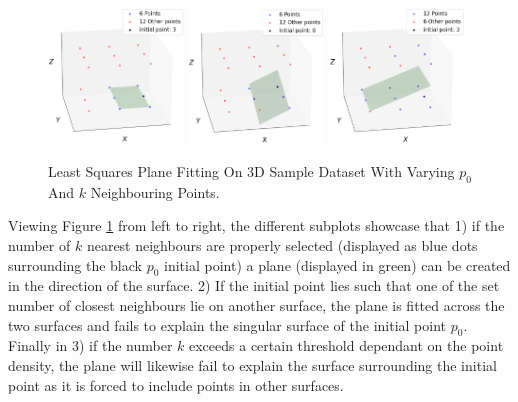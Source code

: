 \documentclass[%
]{USN-MSc}
\begin{document}
\begin{figure}[H]
  \centering
  \includegraphics[width=0.32\textwidth]{fig/6 nearest points.png}
  \includegraphics[width=0.32\textwidth]{fig/6 nearest points edge.png}
  \includegraphics[width=0.32\textwidth]{fig/12 nearest points.png}
  \caption{Least Squares Plane Fitting On 3D Sample Dataset With Varying \(p_0\) And \(k\) Neighbouring Points.}
  \label{fig:Sample Data-set with least squares}
\end{figure}

Viewing Figure \ref{fig:Sample Data-set with least squares} from left to right, the different subplots showcase that 1) if the number of \(k\) nearest neighbours are properly selected (displayed as blue dots surrounding the black \(p_0\) initial point) a plane (displayed in green) can be created in the direction of the surface. 2) If the initial point lies such that one of the set number of closest neighbours lie on another surface, the plane is fitted across the two surfaces and fails to explain the singular surface of the initial point \(p_0\). Finally in 3) if the number \(k\) exceeds a certain threshold dependant on the point density, the plane will likewise fail to explain the surface surrounding the initial point as it is forced to include points in other surfaces.
\end{document}
